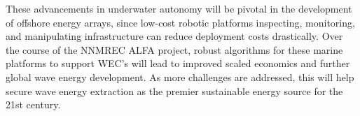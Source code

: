 \documentclass[double,12pt]{beavtex}
\begin{document}
These advancements in underwater autonomy will be pivotal in the development of offshore energy arrays, since low-cost robotic platforms inspecting, monitoring, and manipulating infrastructure can reduce deployment costs drastically. Over the course of the NNMREC ALFA project, robust algorithms for these marine platforms to support WEC's will lead to improved scaled economics and further global wave energy development. As more challenges are addressed, this will help secure wave energy extraction as the premier sustainable energy source for the 21st century.

\pagebreak




\pagebreak

\appendix






\end{document}

